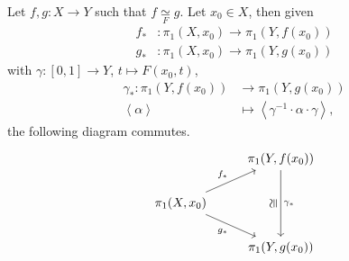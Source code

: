 \begin{lemma}
	Let \(f, g\colon X\to Y\) such that \(f \underset{F}{\simeq }g \). Let \(x_0\in X\), then given
	\[
		\begin{split}
			f_\ast &\colon \pi _1(X, x_0)\to \pi _1(Y, f(x_0))\\
			g_\ast &\colon \pi _1(X, x_0)\to \pi _1(Y, g(x_0))
		\end{split}
	\]
	with \(\gamma \colon [0, 1]\to Y\), \(t\mapsto F(x_0, t)\),
	\[
		\begin{split}
			\gamma _\ast \colon \pi _1(Y, f(x_0))&\to \pi _1(Y, g(x_0))\\
			\left< \alpha  \right> &\mapsto \left< \gamma ^{-1} \cdot \alpha \cdot \gamma  \right>,
		\end{split}
	\]
	the following diagram commutes.
	\[
		\begin{tikzcd}
			& {\pi_1(Y, f(x_0))} \\
			{\pi_1(X, x_0)} \\
			& {\pi_1(Y, g(x_0))}
			\arrow["{\gamma_\ast}", from=1-2, to=3-2]
			\arrow["\cong"{marking}, shift left=2, draw=none, from=3-2, to=1-2]
			\arrow["{f_\ast}", from=2-1, to=1-2]
			\arrow["g_\ast"', from=2-1, to=3-2]
		\end{tikzcd}
	\]
\end{lemma}
